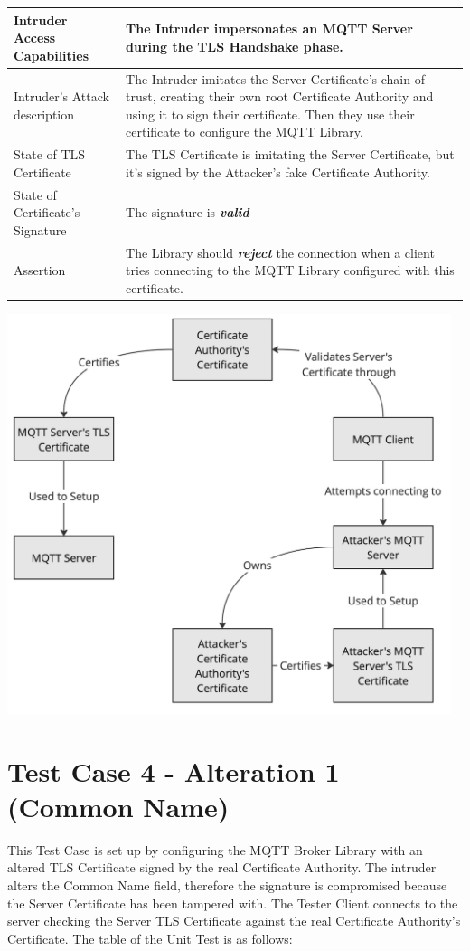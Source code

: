 \documentclass[binding=0.6cm,noexaminfo]{sapthesis}
\begin{document}
\begin{center}
\begin{tabular}{| p{6cm} | p{6cm} |}
\hline
Intruder Access Capabilities & The Intruder impersonates an MQTT Server during the TLS Handshake phase. \\
\hline
Intruder’s Attack description & The Intruder imitates the Server Certificate’s chain of trust, creating their own root Certificate Authority and using it to sign their certificate. Then they use their certificate to configure the MQTT Library. \\
\hline
State of TLS Certificate & The TLS Certificate is imitating the Server Certificate, but it’s signed by the Attacker’s fake Certificate Authority. \\
\hline
State of Certificate’s Signature & The signature is \textbf{\textit{valid}} \\
\hline
Assertion & The Library should \textbf{\textit{reject}} the connection when a client tries connecting to the MQTT Library configured with this certificate. \\
\hline
\end{tabular}
\end{center}

\includegraphics[width=13cm]{TC3}

\section{Test Case 4 - Alteration 1 (Common Name)}
This Test Case is set up by configuring the MQTT Broker Library with an altered TLS Certificate signed by the real Certificate Authority. The intruder alters the Common Name field, therefore the signature is compromised because the Server Certificate has been tampered with. The Tester Client connects to the server checking the Server TLS Certificate against the real Certificate Authority’s Certificate. The table of the Unit Test is as follows:
\end{document}
